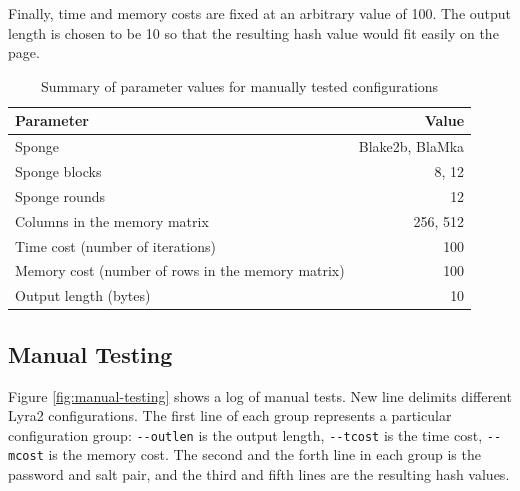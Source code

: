 Finally, time and memory costs are fixed at an arbitrary value of 100. The output length is chosen to be 10 so that the resulting hash value would fit easily on the page.

\begin{table}
\begin{center}
\begin{tabular}{l r}
Parameter & Value \\ \hline
Sponge & Blake2b, BlaMka \\
Sponge blocks & 8, 12 \\
Sponge rounds & 12 \\
Columns in the memory matrix & 256, 512 \\
Time cost (number of iterations) & 100 \\
Memory cost (number of rows in the memory matrix) & 100 \\
Output length (bytes) & 10 \\
\end{tabular}
\end{center}
\caption{Summary of parameter values for manually tested configurations}
\label{table:configuration-summary}
\end{table}

\subsection{Manual Testing}
\label{sec:manual-testing}

Figure \ref{fig:manual-testing} shows a log of manual tests. New line delimits different Lyra2 configurations. The first line of each group represents a particular configuration group: \verb|--outlen| is the output length, \verb|--tcost| is the time cost, \verb|--mcost| is the memory cost. The second and the forth line in each group is the password and salt pair, and the third and fifth lines are the resulting hash values.

